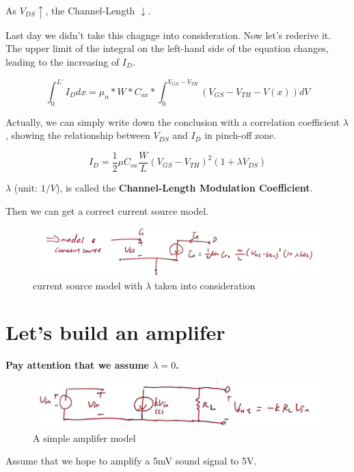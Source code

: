 \documentclass[fontset=windows]{article}
\begin{document}
As $V_{DS}\uparrow$, the Channel-Length $\downarrow$. 

Last day we didn't take this chagnge into consideration. Now let's rederive it. 
The upper limit of the integral on the left-hand side of the equation changes, leading to the increasing of $I_D$. 

$$\int_{0}^{L'} I_Ddx=\mu_{n}*W*C_{ox}*\int_{0}^{V_{GS}-V_{TH}} (V_{GS}-V_{TH}-V(x))dV$$

Actually, we can simply write down the conclusion with a correlation coefficient $\lambda$, showing the relationship between $V_{DS}$ and $I_D$ in pinch-off zone. 

$$I_D=\frac{1}{2} \mu C_{ox}\frac{W}{L}(V_{GS}-V_{TH})^2(1+\lambda V_{DS})$$

$\lambda$ (unit: $1/V$), is called the \textbf{Channel-Length Modulation Coefficient}. 

Then we can get a correct current source model. 

\begin{figure}[htbp]
    \centering
    \includegraphics[scale=0.6]{2.jpg}
    \captionsetup{labelformat=empty}
    \caption{current source model with $\lambda$ taken into consideration}
    \label{2}
\end{figure}

\section*{Let's build an amplifer}

\textbf{Pay attention that we assume $\lambda=0$.} 

\begin{figure}[htbp]
    \centering
    \includegraphics[scale=0.6]{3.jpg}
    \captionsetup{labelformat=empty}
    \caption{A simple amplifer model}
    \label{3}
\end{figure}

Assume that we hope to amplify a 5mV sound signal to 5V. 
\end{document}
